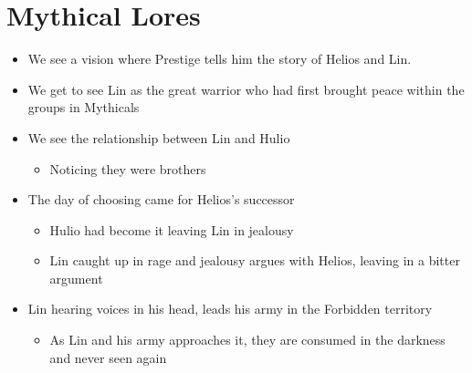 \section{Mythical Lores}
\begin{itemize}
    \item We see a vision where Prestige tells him the story of Helios and Lin.
    \item We get to see Lin as the great warrior who had first brought peace within the groups in Mythicals
    \item We see the relationship between Lin and Hulio
    \begin{itemize}
       \item  Noticing they were brothers
    \end{itemize}
    \item The day of choosing came for Helios’s successor
    \begin{itemize}
       \item Hulio had become it leaving Lin in jealousy
       \item Lin caught up in rage and jealousy argues with Helios, leaving in a bitter argument
    \end{itemize}
    \item Lin hearing voices in his head, leads his army in the Forbidden territory
    \begin{itemize}
       \item As Lin and his army approaches it, they are consumed in the darkness and never seen again
    \end{itemize}
 \end{itemize}